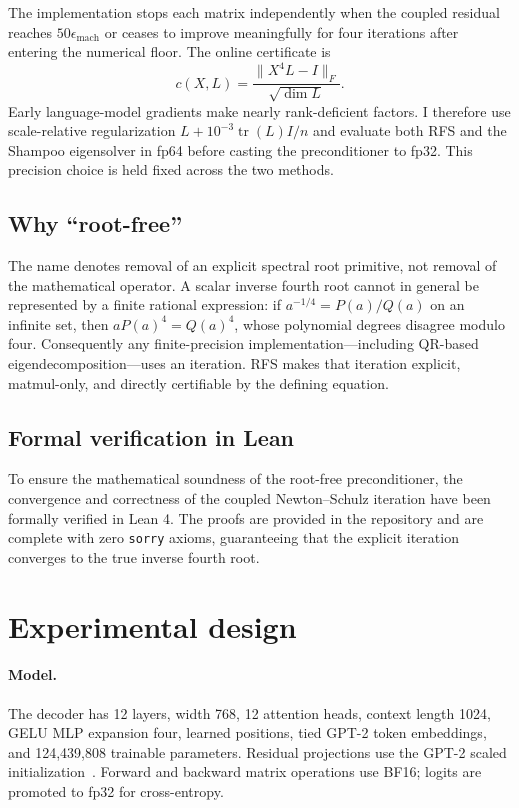 \documentclass[10pt]{article}
\newcommand{\RFS}{\textsc{RFS}}
\begin{document}
The implementation stops each matrix independently when the coupled residual
reaches $50\epsilon_{\mathrm{mach}}$ or ceases to improve meaningfully for four
iterations after entering the numerical floor. The online certificate is
\begin{equation}
  c(X,L)=\frac{\lVert X^4L-I\rVert_F}{\sqrt{\dim L}}.
\end{equation}
Early language-model gradients make nearly rank-deficient factors. I therefore
use scale-relative regularization $L+10^{-3}\operatorname{tr}(L)I/n$ and evaluate
both \RFS{} and the Shampoo eigensolver in fp64 before casting the preconditioner
to fp32. This precision choice is held fixed across the two methods.

\subsection{Why ``root-free''}
The name denotes removal of an explicit spectral root primitive, not removal of
the mathematical operator. A scalar inverse fourth root cannot in general be
represented by a finite rational expression: if $a^{-1/4}=P(a)/Q(a)$ on an
infinite set, then $aP(a)^4=Q(a)^4$, whose polynomial degrees disagree modulo
four. Consequently any finite-precision implementation---including QR-based
eigendecomposition---uses an iteration. \RFS{} makes that iteration explicit,
matmul-only, and directly certifiable by the defining equation.

\subsection{Formal verification in Lean}
To ensure the mathematical soundness of the root-free preconditioner, the convergence and correctness of the coupled Newton--Schulz iteration have been formally verified in Lean 4. The proofs are provided in the repository and are complete with zero \texttt{sorry} axioms, guaranteeing that the explicit iteration converges to the true inverse fourth root.

\section{Experimental design}
\paragraph{Model.}
The decoder has 12 layers, width 768, 12 attention heads, context length 1024,
GELU MLP expansion four, learned positions, tied GPT-2 token embeddings, and
124,439,808 trainable parameters. Residual projections use the GPT-2 scaled
initialization~\citep{radford2019gpt2}. Forward and backward matrix operations use
BF16; logits are promoted to fp32 for cross-entropy.
\end{document}
